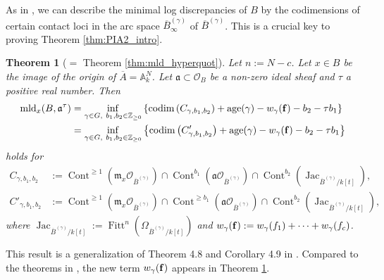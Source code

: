 \documentclass[a4paper,11pt]{amsart}
\newtheorem{thm}{Theorem}[section]
\theoremstyle{definition}
\theoremstyle{remark}
\begin{document}
As in \cite{NS22}, we can describe the minimal log discrepancies of $B$ by the codimensions of certain contact loci in the arc space $\overline{B}^{(\gamma)}_{\infty}$ of $\overline{B}^{(\gamma)}$. 
This is a crucial key to proving Theorem \ref{thm:PIA2_intro}. 

\begin{thm}[{$=$ Theorem \ref{thm:mld_hyperquot}}]\label{thm:mld_hyperquot_intro}
Let $n := N - c$. 
Let $x \in B$ be the image of the origin of $\overline{A} = \mathbb{A}_k ^N$. 
Let $\mathfrak{a} \subset  \mathcal{O}_B$ be a non-zero ideal sheaf and $\tau$ a positive real number. 
Then 
\begin{align*}
\operatorname{mld}_x(B,\mathfrak{a}^{\tau}) 
&= \inf _{\gamma \in G, \ b_1, b_2 \in \mathbb{Z}_{\ge 0}}
\left \{ 
\operatorname{codim} \left( C_{\gamma, b_1, b_2} \right) + \operatorname{age}(\gamma)- w_\gamma({\bf f}) - b_2 - \tau b_1
\right \} \\
&= \inf _{\gamma \in G, \ b_1, b_2 \in \mathbb{Z}_{\ge 0}}
\left \{ 
\operatorname{codim} \left( C' _{\gamma, b_1, b_2} \right) + \operatorname{age}(\gamma) - w_\gamma({\bf f}) - b_2 - \tau b_1
\right \}
\end{align*}
holds for 
\begin{align*}
C_{\gamma, b_1, b_2} 
& := 
\operatorname{Cont}^{\ge 1} \left( \mathfrak{m}_x \mathcal{O}_{\overline{B}^{(\gamma)}} \right) \cap
\operatorname{Cont}^{b_1}  \left( \mathfrak{a} \mathcal{O}_{\overline{B}^{(\gamma)}} \right) \cap  
\operatorname{Cont}^{b_2} \left(\operatorname{Jac}_{\overline{B}^{(\gamma)}/k[t]} \right), \\
C'_{\gamma, b_1, b_2}
& := 
\operatorname{Cont}^{\ge 1} \left(\mathfrak{m}_x \mathcal{O}_{\overline{B}^{(\gamma)}} \right) \cap
\operatorname{Cont}^{\ge b_1}  \left(\mathfrak{a} \mathcal{O}_{\overline{B}^{(\gamma)}} \right) \cap 
\operatorname{Cont}^{b_2} \left(\operatorname{Jac}_{\overline{B}^{(\gamma)}/k[t]} \right),
\end{align*}
where $\operatorname{Jac}_{\overline{B}^{(\gamma)} /k[t]} := 
\operatorname{Fitt}^{n} \left( \Omega _{\overline{B}^{(\gamma)} /k[t]} \right)$ and $w_\gamma({\bf f}) := w_{\gamma}(f_1) + \cdots + w_{\gamma}(f_c)$.
\end{thm}

This result is a generalization of Theorem 4.8 and Corollary 4.9 in \cite{NS22}. 
Compared to the theorems in \cite{NS22}, the new term $w_\gamma({\bf f})$ appears in Theorem \ref{thm:mld_hyperquot_intro}. 
\end{document}
